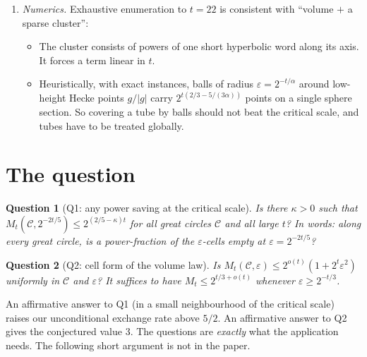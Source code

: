 \documentclass[11pt]{amsart}
\newtheorem*{question}{Question}
\theoremstyle{remark}
\begin{document}
\begin{enumerate}
\item[(N)] \emph{Numerics.} Exhaustive enumeration to $t=22$ is consistent with ``volume $+$ a sparse cluster'':
  \begin{itemize}
  \item The cluster consists of powers of one short hyperbolic word along its axis. It forces a term linear in $t$.
  \item Heuristically, with exact instances, balls of radius $\varepsilon=2^{-t/\alpha}$ around low-height Hecke points $g/|g|$ carry $2^{t(2/3-5/(3\alpha))}$ points on a single sphere section. So covering a tube by balls should not beat the critical scale, and tubes have to be treated globally.
  \end{itemize}
\end{enumerate}

\section{The question}
\begin{question}[Q1: any power saving at the critical scale]
Is there $\kappa>0$ such that $M_t(\mathcal C,2^{-2t/5})\le2^{(2/5-\kappa)t}$ for all great circles $\mathcal C$ and all large $t$? In words: along every great circle, is a power-fraction of the $\varepsilon$-cells empty at $\varepsilon=2^{-2t/5}$?
\end{question}
\begin{question}[Q2: cell form of the volume law]
Is $M_t(\mathcal C,\varepsilon)\le2^{o(t)}(1+2^t\varepsilon^2)$ uniformly in $\mathcal C$ and $\varepsilon$? It suffices to have $M_t\le2^{t/3+o(t)}$ whenever $\varepsilon\ge2^{-t/3}$.
\end{question}
An affirmative answer to Q1 (in a small neighbourhood of the critical scale) raises our unconditional exchange rate above $5/2$. An affirmative answer to Q2 gives the conjectured value $3$. The questions are \emph{exactly} what the application needs. The following short argument is not in the paper.
\end{document}
